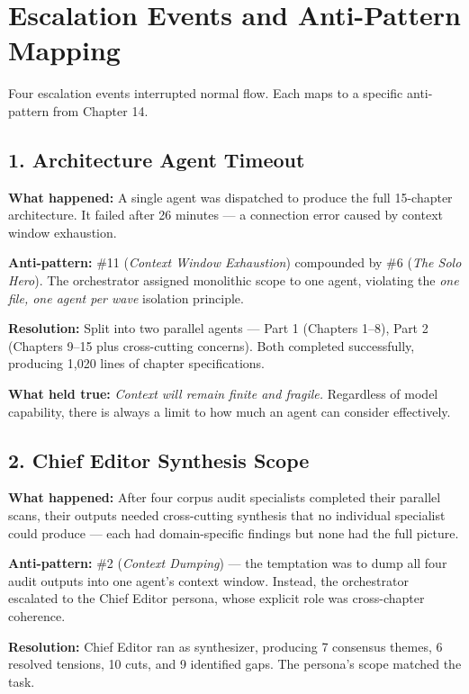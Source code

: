 \documentclass[
  a4paper,
  DIV=11,
  numbers=noendperiod]{scrreprt}
\newcounter{none} %
\begin{document}
\section{Escalation Events and Anti-Pattern
Mapping}\label{escalation-events-and-anti-pattern-mapping}

Four escalation events interrupted normal flow. Each maps to a specific
anti-pattern from Chapter 14.

\subsection{1. Architecture Agent
Timeout}\label{architecture-agent-timeout}

\textbf{What happened:} A single agent was dispatched to produce the
full 15-chapter architecture. It failed after 26 minutes --- a
connection error caused by context window exhaustion.

\textbf{Anti-pattern:} \#11 (\emph{Context Window Exhaustion})
compounded by \#6 (\emph{The Solo Hero}). The orchestrator assigned
monolithic scope to one agent, violating the \emph{one file, one agent
per wave} isolation principle.

\textbf{Resolution:} Split into two parallel agents --- Part 1 (Chapters
1--8), Part 2 (Chapters 9--15 plus cross-cutting concerns). Both
completed successfully, producing 1,020 lines of chapter specifications.

\textbf{What held true:} \emph{Context will remain finite and fragile.}
Regardless of model capability, there is always a limit to how much an
agent can consider effectively.

\subsection{2. Chief Editor Synthesis
Scope}\label{chief-editor-synthesis-scope}

\textbf{What happened:} After four corpus audit specialists completed
their parallel scans, their outputs needed cross-cutting synthesis that
no individual specialist could produce --- each had domain-specific
findings but none had the full picture.

\textbf{Anti-pattern:} \#2 (\emph{Context Dumping}) --- the temptation
was to dump all four audit outputs into one agent's context window.
Instead, the orchestrator escalated to the Chief Editor persona, whose
explicit role was cross-chapter coherence.

\textbf{Resolution:} Chief Editor ran as synthesizer, producing 7
consensus themes, 6 resolved tensions, 10 cuts, and 9 identified gaps.
The persona's scope matched the task.
\end{document}
